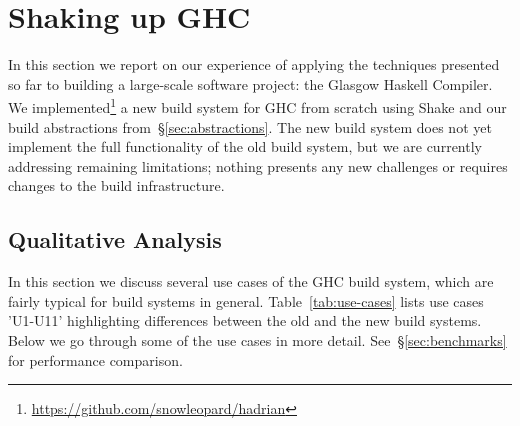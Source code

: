 \section{Shaking up GHC\label{sec:ghc}}

In this section we report on our experience of applying the techniques presented
so far to building a large-scale software project: the Glasgow Haskell Compiler.
We implemented\footnote{\url{https://github.com/snowleopard/hadrian}}
a new build system for GHC from scratch using Shake and our build abstractions
from~\S\ref{sec:abstractions}. The new build system does not yet implement the
full functionality of the old build system, but we are currently addressing
remaining limitations; nothing presents any new challenges or requires changes
to the build infrastructure.

%
%

\subsection{Qualitative Analysis\label{sec:use-cases}}

In this section we discuss several use cases of the GHC build system, which
are fairly typical for build systems in general. Table~\ref{tab:use-cases}
lists use cases \lst'U1-U11' highlighting differences between the old and the
new build systems. Below we go through some of the use cases in more detail.
See~\S\ref{sec:benchmarks} for performance comparison.

